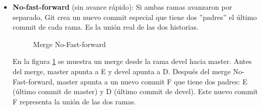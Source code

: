 \documentclass{apuntes_itsv}
\begin{document}
\begin{itemize}
    En la figura \ref{fig:merge_fast_forward} se muestra un merge desde la rama devel hacia master. Antes del merge, master apunta
    a B y devel apunta a E. Después del merge Fast-forward, master también apunta a E, avanzando su puntero
    sin crear un nuevo commit de merge.

  \item \textbf{No-fast-forward} (sin avance rápido):
    Si ambas ramas avanzaron por separado, Git crea un nuevo commit especial que tiene dos ''padres'' el último
    commit de cada rama. Es la unión real de las dos historias.

    \begin{figure}[h]
      \begin{subfigure}[b]{\textwidth}
        \centering
      \end{subfigure}
    
      \begin{subfigure}[b]{\textwidth}
        \centering
      \end{subfigure}
      \caption{Merge No-Fast-forward}
      \label{fig:merge_no_fast_forward}
    \end{figure}

    En la figura \ref{fig:merge_no_fast_forward} se muestra un merge desde la rama devel hacia master. Antes del merge,
    master apunta a E y devel apunta a D. Después del merge No-Fast-forward, master apunta a un nuevo commit F que tiene
    dos padres: E (último commit de master) y D (último commit de devel). Este nuevo commit F representa la unión de las dos ramas.

\end{itemize}
\end{document}
